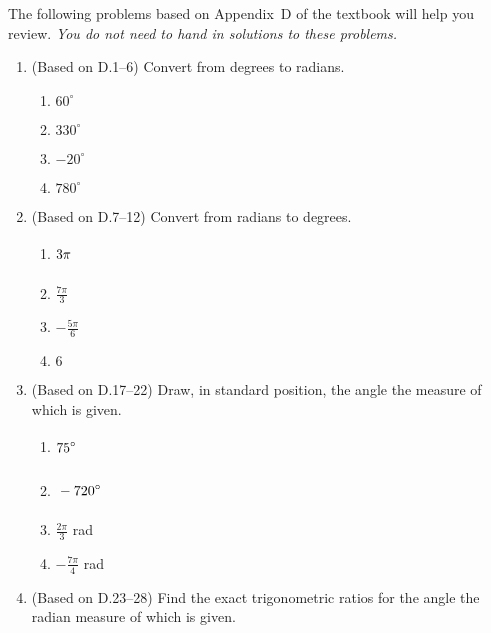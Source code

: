 \documentclass[11pt]{article}
\title{\commonPSTitleZeroZeroD}
\author{\commonAuthor}
\date{\commonDateZeroZeroD}
\newcommand{\ds}{\displaystyle}
\begin{document}
\maketitle
\thispagestyle{empty}

\noindent
The following problems based on Appendix~D of the textbook will help
you review.  \emph{You do not need to hand in solutions to these
  problems.}
\begin{enumerate}
\item (Based on D.1--6) Convert from degrees to radians.
  \begin{multicols}{4}
  \begin{enumerate}
  \item $\ds 60^{\circ}$
  \item $\ds 330^{\circ}$
  \item $\ds -20^{\circ}$
  \item $\ds 780^{\circ}$
  \end{enumerate}
  \end{multicols}
\item (Based on D.7--12) Convert from radians to degrees.
  \begin{multicols}{4}
  \begin{enumerate}
  \item $\ds\vphantom{\frac{9}{9}}3\pi$
  \item $\ds \frac{7\pi}{3}$
  \item $\ds -\frac{5\pi}{6}$
  \item $\ds 6$
  \end{enumerate}
  \end{multicols}
\item (Based on D.17--22) Draw, in standard position, the angle the measure
  of which is given.
  \begin{multicols}{4}
  \begin{enumerate}
  \item $\ds\vphantom{\frac{9\pi}{9}}75^{\circ}$
  \item $\ds\vphantom{\frac{9\pi}{9}} -720^{\circ}$
  \item $\ds \frac{2\pi}{3}$ rad
  \item $\ds -\frac{7\pi}{4}$ rad
  \end{enumerate}
  \end{multicols}
\item (Based on D.23--28) Find the exact trigonometric ratios for the angle
  the radian measure of which is given.
  \begin{multicols}{4}
  \begin{enumerate}

\end{enumerate}
\end{multicols}
\end{enumerate}
\end{document}
